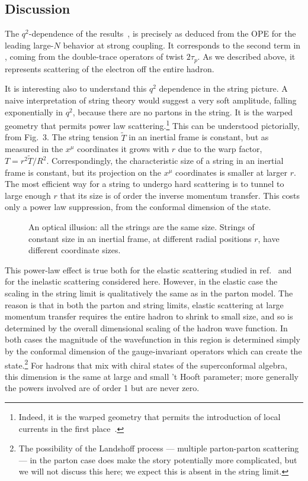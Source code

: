 \subsection{Discussion}

The $q^2$-dependence of the results~,  is precisely as
deduced from the OPE for the leading large-$N$ behavior at strong coupling.  It
corresponds to the second term in , coming from the double-trace
operators of twist $2\tau_p$.  As we described above, it represents 
scattering of
the electron off the entire hadron.

It is interesting also to understand this
$q^2$ dependence in the string picture.
A naive interpretation of string theory would suggest a very soft
amplitude, falling exponentially in $q^2$, because there are no partons in
the string.  It is the
warped geometry that permits power law scattering.\footnote
{Indeed, it is the warped geometry that permits the introduction of local
currents in the first place~\cite{size}.}
This can be understood pictorially, from
Fig.~3.  The string tension $\tilde T$ in an inertial frame is constant, but as
measured in the $x^\mu$ coordinates it grows with $r$ due to the warp factor,
$T = r^2 \tilde T /R^2$.  Correspondingly, the characteristic size of a
string in an inertial frame is constant, but its projection on the $x^\mu$
coordinates is smaller at larger $r$.  The most 
efficient way for
a string to undergo hard scattering is to tunnel to large enough $r$ that its
size is of order the inverse momentum transfer.  This costs only a power
law suppression, from the conformal dimension of the state.
\begin{figure}
\begin{center}
\leavevmode
{}
\end{center}
\caption{An optical illusion: all the strings are the same size.  Strings of
constant size in an inertial frame, at different radial positions $r$, have
different coordinate sizes.}
\end{figure}

This power-law effect is true both for the elastic scattering studied in ref.~\cite{PShard} and
for the inelastic scattering considered here.  However, in the elastic case 
the scaling in
the string limit is qualitatively the same as in the parton model.   The reason is that in both the 
parton and string limits, elastic scattering at large momentum transfer requires the 
entire hadron to shrink to small size, and so is determined by the overall dimensional
scaling of the hadron wave function.   In both cases the magnitude of the wavefunction in this region is
determined simply by the conformal dimension of the gauge-invariant operators
which can create the state.\footnote{The possibility
of the Landshoff process --- multiple parton-parton scattering ---
in the parton case does make the story potentially more complicated,
but we will not discuss this here; we expect this is absent in the string limit.}
For hadrons that mix
with chiral states of the superconformal algebra, this dimension is the same
at large and small 't Hooft parameter; more generally the powers involved
are of order 1 but are never zero.


